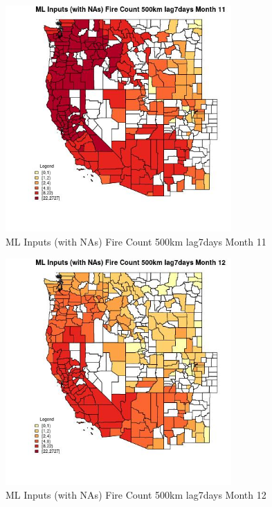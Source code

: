 \begin{figure} 
\centering  
\includegraphics[width=0.77\textwidth]{Code_Outputs/Report_ML_input_PM25_Step4_part_f_de_duplicated_aveswNAs_CountyFire_Count_500km_lag7daysmedianMonth11.jpg} 
\caption{\label{fig:Report_ML_input_PM25_Step4_part_f_de_duplicated_aveswNAsCountyFire_Count_500km_lag7daysmedianMonth11}ML Inputs (with NAs) Fire Count 500km lag7days Month 11} 
\end{figure} 
 

\begin{figure} 
\centering  
\includegraphics[width=0.77\textwidth]{Code_Outputs/Report_ML_input_PM25_Step4_part_f_de_duplicated_aveswNAs_CountyFire_Count_500km_lag7daysmedianMonth12.jpg} 
\caption{\label{fig:Report_ML_input_PM25_Step4_part_f_de_duplicated_aveswNAsCountyFire_Count_500km_lag7daysmedianMonth12}ML Inputs (with NAs) Fire Count 500km lag7days Month 12} 
\end{figure} 
 

